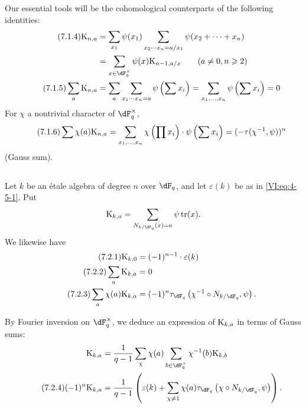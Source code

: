 Our essential tools will be the cohomological counterparts of the 
following identities: 
\begin{align*}\tag{7.1.4}\label{VI:eq:7-1-4}
  \kloos_{n,a} &= \sum_{x_1} \psi(x_1) \sum_{x_2\dotsm x_n = a/x_1} \psi(x_2+\cdots + x_n) \\ \notag
    &= \sum_{x\in \dF_q^\times} \psi(x) \kloos_{n-1,a/x} \qquad (a\ne 0,n\geqslant 2) \\ \tag{7.1.5}\label{VI:eq:7-1-5}
  \sum_a \kloos_{n,a} &= \sum_a \sum_{x_1 \dotsm x_n = a} \psi\left(\sum x_i\right) = \sum_{x_1,\dots,x_n} \psi\left(\sum x_i\right) = 0 
\end{align*}
For $\chi$ a nontrivial character of $\dF_q^\times$, 
\begin{equation*}\tag{7.1.6}\label{VI:eq:7-1-6}
  \sum \chi(a) \textnormal{K}_{n,a} = \sum_{x_1,\dots,x_n} \chi\left(\prod x_i\right) \cdot \psi\left(\sum x_i\right) = (-\tau(\chi^{-1},\psi))^n 
\end{equation*}
(Gauss sum). 





\subsection{}\label{VI:7-2}

Let $k$ be an étale algebra of degree $n$ over $\dF_q$, and let $\varepsilon(k)$ 
be as in \eqref{VI:eq:4-5-1}. Put 
\[
  \kloos_{k,a} = \sum_{N_{k/\dF_q}(x)=a} \psi \tr(x) \text{.} 
\]
We likewise have 
\begin{align*}\tag{7.2.1}\label{VI:eq:7-2-1}
  \kloos_{k,0} &= (-1)^{n-1} \cdot \varepsilon(k) \\ \tag{7.2.2}\label{VI:eq:7-2-2}
  \sum_a \kloos_{k,a} &= 0 \\ \tag{7.2.3}\label{VI:eq:7-2-3}
  \sum_a \chi(a) \kloos_{k,a} &= (-1)^n \tau_{\dF_q}\left(\chi^{-1}\circ N_{k/\dF_q},\psi\right) \text{.} 
\end{align*}

By Fourier inversion on $\dF_q^\times$, we deduce an expression of 
$\textnormal{K}_{k,a}$ in terms of Gauss sums: 
\begin{align*} 
  \kloos_{k,a} &= \frac{1}{q-1} \sum_\chi \chi(a) \sum_{b\in \dF_q^\times} \chi^{-1}(b) \kloos_{k,b} \\ \tag{7.2.4}\label{VI:eq:7-2-4}
  (-1)^n \kloos_{k,a} &= \frac{1}{q-1} \left(\varepsilon(k) + \sum_{\chi\ne 1} \chi(a) \tau_{\dF_q}\left(\chi\circ N_{k/\dF_q},\psi\right) \right) \text{.} 
\end{align*}

